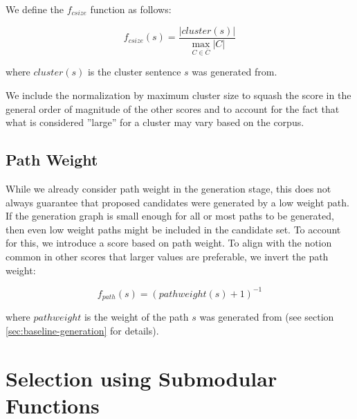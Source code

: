 \documentclass[a4paper,BCOR=10mm]{report}
\numberwithin{lemma}{chapter}
\numberwithin{definition}{chapter}
\begin{document}
We define the $f_{\mathit{csize}}$ function as follows:

\begin{equation}
f_{\mathit{csize}}(s) = \frac{|\mathit{cluster}(s)|}{\max_{C \in \bar{C}}{|C|}}
\end{equation}

where $\mathit{cluster}(s)$ is the cluster sentence $s$ was generated from.

We include the normalization by maximum cluster size to squash the score in the general order of magnitude of the other scores and to account for the fact that what is considered ''large'' for a cluster may vary based on the corpus.


\subsection{Path Weight}

While we already consider path weight in the generation stage, this does not always guarantee that proposed candidates were generated by a low weight path. If the generation graph is small enough for all or most paths to be generated, then even low weight paths might be included in the candidate set.
To account for this, we introduce a score based on path weight. To align with the notion common in other scores that larger values are preferable, we invert the path weight:

\begin{equation}
f_{path}(s) = (\mathit{pathweight}(s) + 1)^{-1}
\end{equation}

where $\mathit{pathweight}$ is the weight of the path $s$ was generated from (see section \ref{sec:baseline-generation} for details).


\section{Selection using Submodular Functions}

\end{document}
